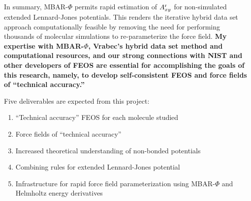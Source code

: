 \documentclass[12pt,a4paper]{article}
\begin{document}
In summary, MBAR-$\Phi$ permits rapid estimation of $A_{xy}^{\rm r}$ for non-simulated extended Lennard-Jones potentials. This renders the iterative hybrid data set approach computationally feasible by removing the need for performing thousands of molecular simulations to re-parameterize the force field. \textbf{My expertise with MBAR-$\Phi$, Vrabec's hybrid data set method and computational resources, and our strong connections with NIST and other developers of FEOS are essential for accomplishing the goals of this research, namely, to develop self-consistent FEOS and force fields of ``technical accuracy.''} 


Five deliverables are expected from this project:
\begin{enumerate}[nolistsep]
	\item ``Technical accuracy'' FEOS for each molecule studied
	\item Force fields of ``technical accuracy''
	\item Increased theoretical understanding of non-bonded potentials 
	\item Combining rules for extended Lennard-Jones potential
	\item Infrastructure for rapid force field parameterization using MBAR-$\Phi$ and Helmholtz energy derivatives
\end{enumerate}


\end{document}
